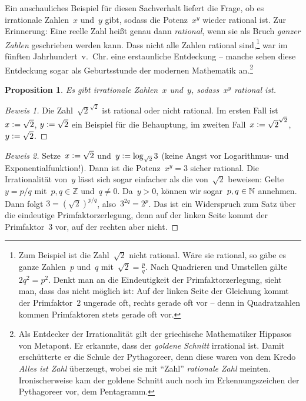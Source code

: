 \documentclass[twoside]{../zirkelblatt}
\newcommand{\ZZ}{\mathbb{Z}}
\newcommand{\defeq}{\vcentcolon=}
\theoremstyle{definition}
\theoremstyle{plain}
\newtheorem{prop}[defn]{Proposition}
\theoremstyle{remark}
\begin{document}
Ein anschauliches Beispiel für diesen Sachverhalt liefert die Frage, ob
es irrationale Zahlen~$x$ und~$y$ gibt, sodass die Potenz~$x^y$ wieder rational ist.
Zur Erinnerung: Eine reelle Zahl heißt genau dann \emph{rational}, wenn sie
als Bruch \emph{ganzer Zahlen} geschrieben werden kann. Dass nicht alle Zahlen
rational sind,\footnote{Zum Beispiel ist die Zahl~$\sqrt{2}$ nicht rational.
Wäre sie rational, so gäbe es ganze Zahlen~$p$ und~$q$ mit~$\sqrt{2} =
\frac{p}{q}$. Nach Quadrieren und Umstellen gälte~$2q^2 = p^2$. Denkt man an die
Eindeutigkeit der Primfaktorzerlegung, sieht man, dass das nicht möglich ist:
Auf der linken Seite der Gleichung kommt der Primfaktor~$2$ ungerade oft,
rechts gerade oft vor -- denn in Quadratzahlen kommen Primfaktoren stets
gerade oft vor.}
war im fünften Jahrhundert~v.~Chr. eine erstaunliche Entdeckung
-- manche sehen diese Entdeckung sogar als Geburtsstunde der modernen
Mathematik an.\footnote{Als Entdecker der Irrationalität gilt der griechische
Mathematiker Hippasos von
Metapont. Er erkannte, dass der \emph{goldene Schnitt} irrational ist. Damit
erschütterte er die Schule der Pythagoreer, denn diese waren von dem Kredo
\emph{Alles ist Zahl} überzeugt, wobei sie mit "`Zahl"' \emph{rationale Zahl}
meinten. Ironischerweise kam der goldene Schnitt auch noch im Erkennungszeichen der
Pythagoreer vor, dem Pentagramm.}

\begin{prop}Es gibt irrationale Zahlen~$x$ und~$y$, sodass~$x^y$ rational ist.
\end{prop}
\begin{proof}[Beweis 1] Die Zahl~$\sqrt{2}^{\sqrt{2}}$ ist rational oder nicht
rational. Im ersten Fall ist~$x \defeq \sqrt{2}$, $y \defeq \sqrt{2}$ ein Beispiel für
die Behauptung, im zweiten Fall~$x \defeq \sqrt{2}^{\sqrt{2}}$, $y \defeq \sqrt{2}$.
\end{proof}
\begin{proof}[Beweis 2] Setze~$x \defeq \sqrt{2}$ und~$y \defeq \log_{\sqrt{2}} 3$
(keine Angst vor Logarithmus- und Exponentialfunktion!).
Dann ist die Potenz~$x^y = 3$ sicher rational. Die Irrationalität von~$y$ lässt sich
sogar einfacher als die von~$\sqrt{2}$ beweisen:
Gelte~$y = p/q$ mit~$p, q \in \ZZ$ und~$q \neq 0$. Da~$y > 0$, können wir
sogar~$p, q \in \mathbb{N}$ annehmen.
Dann folgt $3 = (\sqrt{2})^{p/q}$, also~$3^{2q} = 2^p$. Das ist ein
Widerspruch zum Satz über die eindeutige Primfaktorzerlegung, denn auf der linken
Seite kommt der Primfaktor~$3$ vor, auf der rechten aber nicht.
\end{proof}
\end{document}
